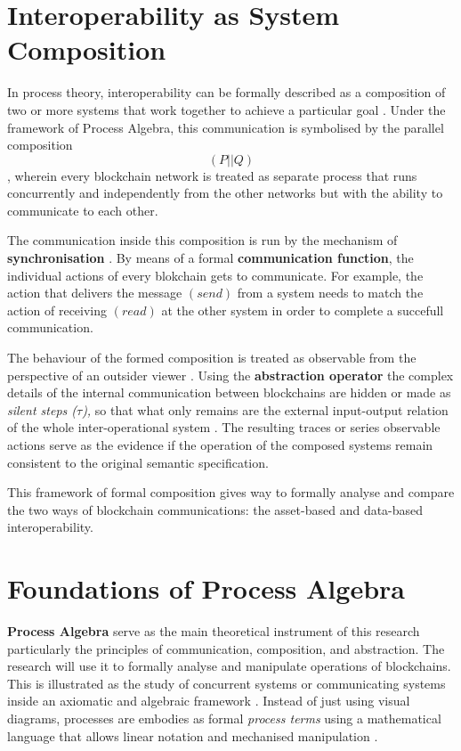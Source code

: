 \section{Interoperability as System
Composition}\label{interoperability-as-system-composition}

In process theory, interoperability can be formally described as a
composition of two or more systems that work together to achieve a
particular goal \citep{lalli2024}. Under the framework of Process
Algebra, this communication is symbolised by the parallel composition
\[ (P || Q) \], wherein every blockchain network is treated as separate
process that runs concurrently and independently from the other networks
but with the ability to communicate to each other.

The communication inside this composition is run by the mechanism of
\textbf{synchronisation} \citep{milner1989communication}. By means of a
formal \textbf{communication function}, the individual actions of every
blokchain gets to communicate. For example, the action that delivers the
message \((send)\) from a system needs to match the action of receiving
\((read)\) at the other system in order to complete a succefull
communication.

The behaviour of the formed composition is treated as observable from
the perspective of an outsider viewer \citep{milner1989communication}.
Using the \textbf{abstraction operator} the complex details of the
internal communication between blockchains are hidden or made as
\emph{silent steps (\(\tau\)),} so that what only remains are the
external input-output relation of the whole inter-operational system
\citep{fokkink2007introduction}. The resulting traces or series
observable actions serve as the evidence if the operation of the
composed systems remain consistent to the original semantic
specification.

This framework of formal composition gives way to formally analyse and
compare the two ways of blockchain communications: the asset-based and
data-based interoperability.

\section{Foundations of Process
Algebra}\label{foundations-of-process-algebra}

\textbf{Process Algebra} serve as the main theoretical instrument of
this research particularly the principles of communication, composition,
and abstraction. The research will use it to formally analyse and
manipulate operations of blockchains. This is illustrated as the study
of concurrent systems or communicating systems inside an axiomatic and
algebraic framework \citep{bergstra1982fixed}
\citep{fokkink2007introduction}. Instead of just using visual diagrams,
processes are embodies as formal \emph{process terms} using a
mathematical language that allows linear notation and mechanised
manipulation \citep{fokkink2007introduction}.

